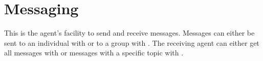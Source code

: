 \documentclass[letterpaper,10pt,english]{sphinxmanual}
\begin{document}
\chapter{Messaging}
\label{Messaging:messaging}\label{Messaging:module-messaging}\label{Messaging::doc}
This is the agent's facility to send and receive messages. Messages can
either be sent to an individual with {\hyperref[Messaging:messaging.Messaging.message]{}} or to a group with
{\hyperref[Messaging:messaging.Messaging.message_to_group]{}}. The receiving agent can either get all messages
with  {\hyperref[Messaging:messaging.Messaging.get_messages_all]{}} or messages with a specific topic with
{\hyperref[Messaging:messaging.Messaging.get_messages]{}}.
\end{document}
